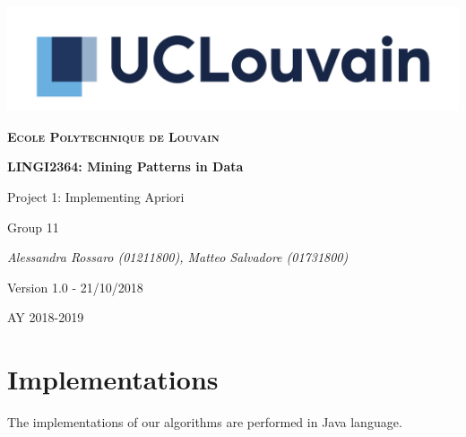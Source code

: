 \documentclass[11pt, a4paper]{article}
\begin{document}
	\begin{titlepage}
		\centering
		\includegraphics[scale =0.8]{logo.jpg}\par\vspace{1cm}
		{\scshape\LARGE\bfseries Ecole Polytechnique de Louvain\par}
		\vspace{1.5cm}
		{\scshape\Large \par}
		\vspace{1.5cm}
		{\huge\bfseries LINGI2364: Mining Patterns in Data \par}
		\vspace{1cm}
		{\Huge Project 1: Implementing Apriori \par}
		\vspace{2cm}
		{\LARGE Group 11\par}
		\vspace{1cm}
		{\Large\itshape Alessandra Rossaro (01211800), Matteo Salvadore (01731800)\par}
		\vspace{2cm}
		{\small Version 1.0 - 21/10/2018\par}

		\vfill

		{\large AY 2018-2019\par}
	\end{titlepage}

	\section{Implementations}
	The implementations of our algorithms are performed in Java language.
\end{document}
